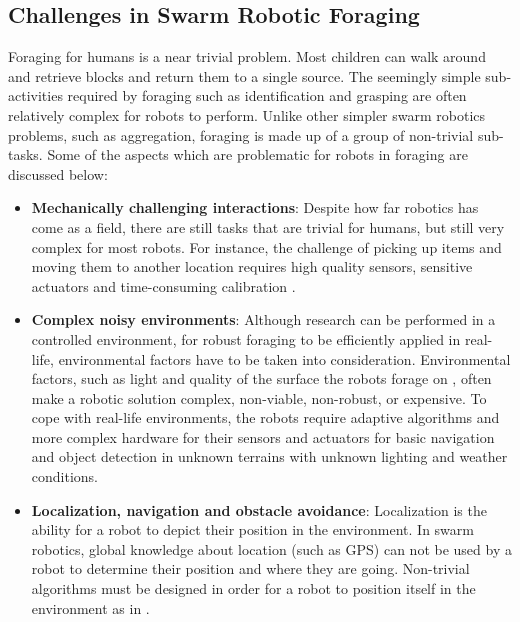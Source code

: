 \subsection{Challenges in Swarm Robotic Foraging}
\label{challengesinforaging}

Foraging for humans is a near trivial problem. Most children can walk around and retrieve blocks and return them to a single source. The seemingly simple sub-activities required by foraging such as identification and grasping are often relatively complex for robots to perform. Unlike other simpler swarm robotics problems, such as aggregation, foraging is made up of a group of non-trivial sub-tasks. Some of the aspects which are problematic for robots in foraging are discussed below:

\begin{itemize}
\item \textbf{Mechanically challenging interactions}: Despite how far robotics has come as a field, there are still tasks that are trivial for humans, but still very complex for most robots. For instance, the challenge of picking up items \cite{saxena2008robotic} and moving them to another location requires high quality sensors, sensitive actuators and time-consuming calibration \cite{mondada2005cooperation}. 

\item \textbf{Complex noisy environments}: Although research can be performed in a controlled environment, for robust foraging to be efficiently applied in real-life, environmental factors have to be taken into consideration. Environmental factors, such as light \cite{browning2005real,jungel2003real} and quality of the surface the robots forage on \cite{trianni2006cooperative}, often make a robotic solution complex, non-viable, non-robust, or expensive. To cope with real-life environments, the robots require adaptive algorithms and more complex hardware for their sensors and actuators for basic navigation and object detection in unknown terrains with unknown lighting and weather conditions. 

\item \textbf{Localization, navigation and obstacle avoidance}: Localization is the ability for a robot to depict their position in the environment. In swarm robotics, global knowledge about location (such as GPS) can not be used by a robot to determine their position and where they are going. Non-trivial algorithms must be designed in order for a robot to position itself in the environment as in \cite{zhou2012motion,rothermich2004distributed,arkin1992cooperation}. 

\end{itemize}

